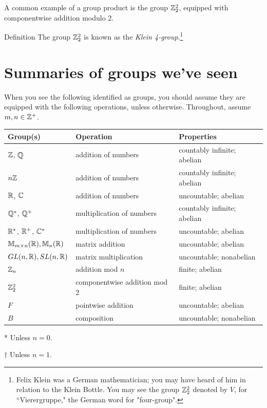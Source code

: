\begin{example}{}
A common example of a group product is the group $\mathbb{Z}_2^2$, equipped with componentwise addition modulo 2. \end{example}

\begin{df}{Definition} The group $\mathbb{Z}_2^2$ is known as the \textit{Klein 4-group}.\footnote{Felix Klein was a German mathematician; you may have heard of him in relation to the Klein Bottle. You may see the group $\mathbb{Z}_2^2$ denoted by $V$, for ``Vierergruppe," the German word for "four-group".} \end{df}

\section{Summaries of groups we've seen}
When you see the following identified as groups, you should
assume they are equipped with the following operations, unless
otherwise. Throughout, assume $m,n\in \mathbb{Z}^+$.
\begin{center}
\begin{threeparttable}
\renewcommand{\arraystretch}{1.3}
\begin{tabular}{|l|l|l|} \hline \textbf{Group(s)} &\textbf{Operation}&
\textbf{Properties} \\\hline $\mathbb{Z}$, $\mathbb{Q}$ & addition of numbers & countably
infinite; abelian%
\\\hline $n\mathbb{Z}$ &  addition of numbers
& countably infinite; abelian\tnote{*}%
\\\hline $\mathbb{R}$, $\mathbb{C}$ & addition of numbers&
uncountable; abelian%
\\\hline $\mathbb{Q}^*$, $\mathbb{Q}^+$ &
multiplication of  numbers& countably infinite; abelian%
\\\hline $\mathbb{R}^*$, $\mathbb{R}^+$, $\mathbb{C}^*$ &
multiplication of  numbers& uncountable; abelian%
\\\hline
$\mathbb{M}_{m\times n}(\mathbb{R}), \mathbb{M}_n(\mathbb{R})$ & matrix addition &
uncountable; abelian%
\\\hline $GL(n,\mathbb{R}), SL(n,\mathbb{R})$ &
 matrix multiplication& uncountable; nonabelian\tnote{$\dagger$}%
\\\hline $\mathbb{Z}_n$ & addition mod $n$  & finite; abelian%
\\\hline $\mathbb{Z}_2^2$& componentwise addition mod 2& finite; abelian%
\\\hline $F$& pointwise addition& uncountable; abelian
\\ \hline$B$&composition&uncountable; nonabelian\\
\hline
\end{tabular}
\begin{tablenotes}
\item[*]\small Unless $n=0$.
\item[$\dagger$]\small Unless $n=1$.
\end{tablenotes}
\end{threeparttable}
\end{center}


